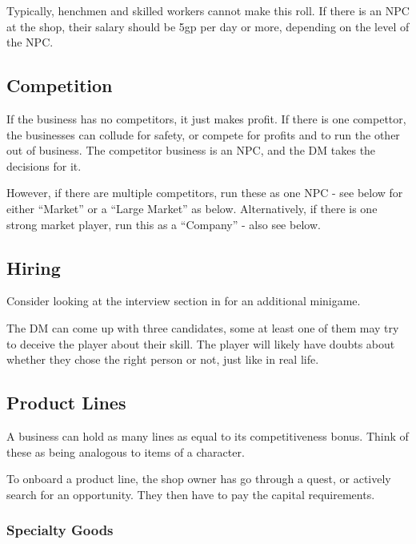 \documentclass[twocolumn]{dndbook}
\begin{document}
Typically, henchmen and skilled workers cannot make this roll. If there is an NPC at the shop,
their salary should be 5gp per day or more, depending on the level of the NPC.

\subsection{Competition}
If the business has no competitors, it just makes profit.
If there is one compettor, the businesses can collude for safety, or compete for profits
and to run the other out of business. The competitor business is an NPC,
and the DM takes the decisions for it.\par

However, if there are multiple competitors, run these as one NPC - see below
for either ``Market'' or a ``Large Market'' as below.
Alternatively, if there is one strong
market player, run this as a ``Company'' - also see below.

\subsection{Hiring}

Consider looking at the interview section in 
for an additional minigame.\par

The DM can come up with three candidates, some at least one of them may try to deceive the player about their skill.
The player will likely have doubts about whether they chose the right person or not, just like in real life.\par

\subsection{Product Lines}

A business can hold as many lines as equal to its competitiveness bonus.
Think of these as being analogous to items of a character.\par

To onboard a product line, the shop owner has go through a quest, or
actively search for an opportunity. They then have to pay the
capital requirements.\par

\subsubsection{Specialty Goods}
\end{document}
